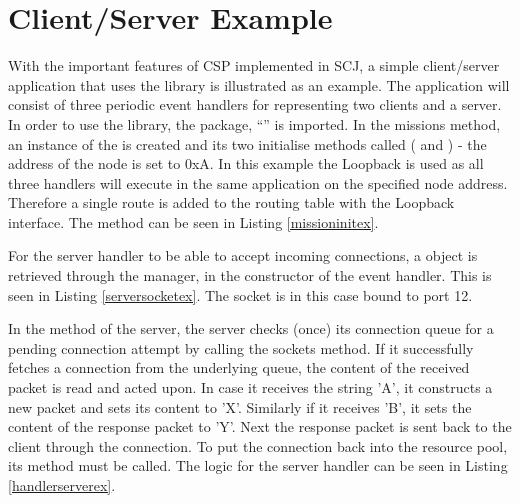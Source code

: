 \section{Client/Server Example} %
\label{sec:client_server_example}
With the important features of CSP implemented in SCJ, a simple client/server application that uses the library is illustrated as an example. The application will consist of three periodic event handlers for representing two clients and a server. In order to use the library, the package, ``'' is imported. In the missions  method, an instance of the  is created and its two initialise methods called ( and ) - the address of the node is set to 0xA. In this example the Loopback is used as all three handlers will execute in the same application on the specified node address. Therefore a single route is added to the routing table with the Loopback interface. The  method can be seen in Listing \ref{missioninitex}. 



For the server handler to be able to accept incoming connections, a  object is retrieved through the manager, in the constructor of the event handler. This is seen in Listing \ref{serversocketex}. The socket is in this case bound to port 12.



In the  method of the server, the server checks (once) its connection queue for a pending connection attempt by calling the sockets  method. If it successfully fetches a connection from the underlying queue, the content of the received packet is read and acted upon. In case it receives the string 'A', it constructs a new packet and sets its content to 'X'. Similarly if it receives 'B', it sets the content of the response packet to 'Y'. Next the response packet is sent back to the client through the connection. To put the connection back into the resource pool, its  method must be called. The logic for the server handler can be seen in Listing \ref{handlerserverex}.



